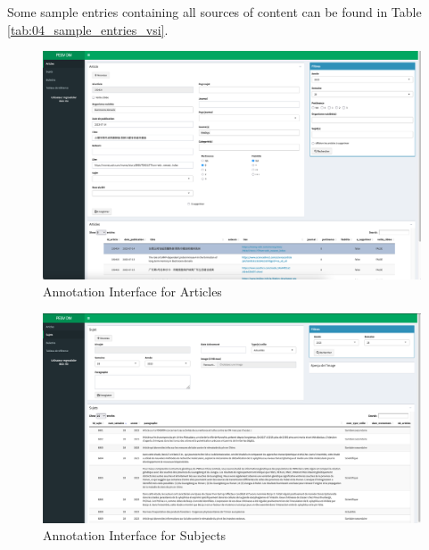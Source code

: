 Some sample entries containing all sources of content can be found in Table \ref{tab:04_sample_entries_vsi}.

\begin{landscape}
    \begin{figure}[ht]
        \centering
        \includegraphics[width=1.20\textwidth]{Figures/04/PESV_interface_1.png}
        \caption{\VSI{} Annotation Interface for Articles}
        \label{fig:04_pesv_interface_1}
    \end{figure}
\end{landscape}

\begin{landscape}
    \begin{figure}[ht]
        \centering
        \includegraphics[width=1.20\textwidth]{Figures/04/PESV_interface_2.png}
        \caption{\VSI{} Annotation Interface for Subjects}
        \label{fig:04_pesv_interface_2}
    \end{figure}
\end{landscape}




